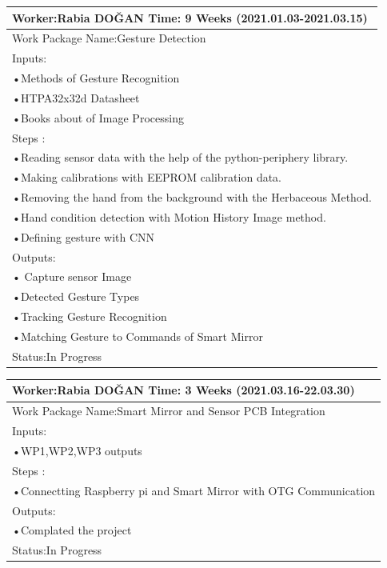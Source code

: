 \documentclass{deutez}
\newcommand\tab[1][1cm]{\hspace*{#1}}
\begin{document}
	\FloatBarrier
	\begin{table}[h!]
		\begin{adjustbox}{width=\textwidth}
			\begin{tabular}{|l|}\hline
				Worker:Rabia DOĞAN   \tab[8cm] Time: 9 Weeks (2021.01.03-2021.03.15)\\\hline
				Work Package Name:Gesture Detection\\\hline
				Inputs:\\
				•Methods of Gesture Recognition\\
				•HTPA32x32d Datasheet\\
				•Books about of Image Processing\\\hline	
				Steps :\\
				•Reading sensor data with the help of the python-periphery library.\\
				•Making calibrations with EEPROM calibration data.\\
				•Removing the hand from the background with the Herbaceous Method.\\
				•Hand condition detection with Motion History Image method.\\
				•Defining gesture with CNN\\
				Outputs:\\
				• Capture sensor Image\\
				•Detected Gesture Types \\
				•Tracking Gesture Recognition \\
				•Matching Gesture to Commands of Smart Mirror\\\hline
				Status:In Progress\\\hline
			\end{tabular}
		\end{adjustbox}
	\end{table}
	\newpage
	\begin{table}[h!]
		\begin{adjustbox}{width=\textwidth}
			\begin{tabular}{|l|}\hline
				Worker:Rabia DOĞAN   \tab[8cm] Time: 3 Weeks (2021.03.16-22.03.30)\\\hline
				Work Package Name:Smart Mirror and Sensor PCB Integration\\\hline
				Inputs:\\
				•WP1,WP2,WP3 outputs \\\hline	
				Steps : \\
				•Connectting Raspberry pi and Smart Mirror with OTG Communication\\\hline
				Outputs:\\
				•Complated the project\\\hline
				Status:In Progress\\\hline
			\end{tabular}
		\end{adjustbox}
	\end{table}
\end{document}
